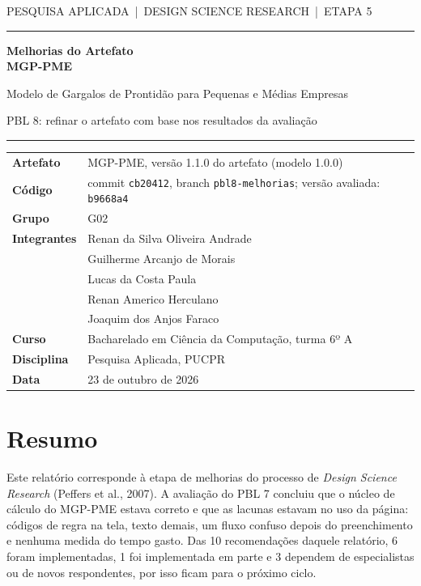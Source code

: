 \documentclass[11pt,a4paper]{article}
\renewcommand{\arraystretch}{1.25}
\begin{document}
\begin{titlepage}
\sffamily\setlength{\parindent}{0pt}
\vspace*{3.2cm}
{\small PESQUISA APLICADA \,|\, DESIGN SCIENCE RESEARCH \,|\, ETAPA 5}\par\vspace{6pt}
\rule{\linewidth}{0.8pt}\par\vspace{1.4cm}
{\fontsize{30}{36}\selectfont\bfseries Melhorias do Artefato\\MGP-PME\par}\vspace{0.9cm}
{\large Modelo de Gargalos de Prontidão para Pequenas e Médias Empresas\par}\vspace{0.5cm}
{\normalsize PBL 8: refinar o artefato com base nos resultados da avaliação\par}\vspace{1.2cm}
\rule{\linewidth}{0.4pt}
\vfill
{\footnotesize\renewcommand{\arraystretch}{1.25}
\begin{tabular}{@{}p{3.6cm}p{11.6cm}@{}}
\textbf{Artefato} & MGP-PME, versão 1.1.0 do artefato (modelo 1.0.0) \\
\textbf{Código} & commit \texttt{cb20412}, branch \texttt{pbl8-melhorias}; versão avaliada: \texttt{b9668a4} \\
\textbf{Grupo} & G02 \\
\textbf{Integrantes} & Renan da Silva Oliveira Andrade \\ & Guilherme Arcanjo de Morais \\ & Lucas da Costa Paula \\ & Renan Americo Herculano \\ & Joaquim dos Anjos Faraco \\
\textbf{Curso} & Bacharelado em Ciência da Computação, turma 6º A \\
\textbf{Disciplina} & Pesquisa Aplicada, PUCPR \\
\textbf{Data} & 23 de outubro de 2026 \\
\end{tabular}}
\vspace*{1.4cm}
\end{titlepage}

\markboth{}{}
\section*{Resumo}
Este relatório corresponde à etapa de melhorias do processo de \emph{Design Science Research} (Peffers et al., 2007).
A avaliação do PBL 7 concluiu que o núcleo de cálculo do MGP-PME estava correto e que as lacunas estavam no uso da
página: códigos de regra na tela, texto demais, um fluxo confuso depois do preenchimento e nenhuma medida do tempo
gasto. Das 10 recomendações daquele relatório, 6 foram implementadas, 1 foi implementada em parte e
3 dependem de especialistas ou de novos respondentes, por isso ficam para o próximo ciclo.
\end{document}
